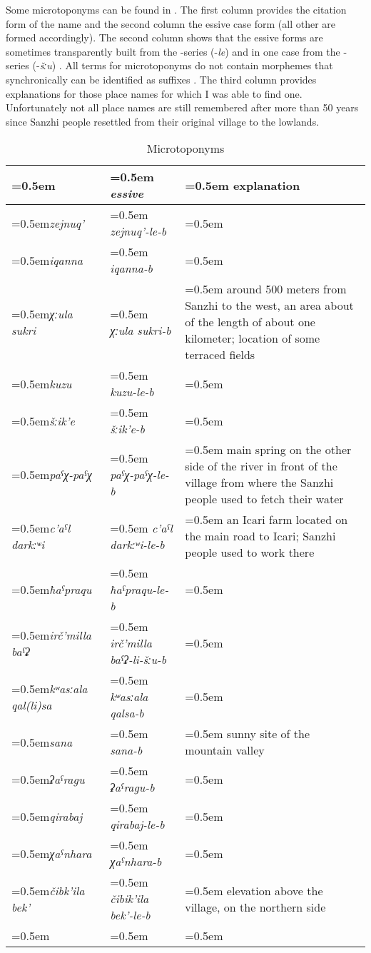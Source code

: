 Some microtoponyms can be found in . The first column provides the citation form of the name and the second column the essive case form (all other  are formed accordingly). The second column shows that the essive forms are sometimes transparently built from the -series (-\textit{le}) and in one case from the -series (-\textit{šːu}) . All terms for microtoponyms do not contain morphemes that synchronically can be identified as  suffixes . The third column provides explanations for those place names for which I was able to find one. Unfortunately not all place names are still remembered after more than 50 years since Sanzhi people resettled from their original village to the lowlands. 
%
\begin{table}
	\caption{Microtoponyms}
	\label{tab:Microtoponyms}
	\small
	\begin{tabularx}{0.98\textwidth}[]{%
		>{\raggedright\arraybackslash\hangindent=0.5em\itshape}p{60pt}
		>{\raggedright\arraybackslash\hangindent=0.5em\itshape}p{85pt}
		>{\raggedright\arraybackslash\hangindent=0.5em}X}
		
		\lsptoprule
		\upshape \isit{microtoponym}	&	\upshape essive 	&	explanation\\
		\midrule
		zejnuq' 		&	zejnuq'-le-b 		&	\\
		iqanna		&	iqanna-b		&	\\
		χːula sukri		&	χːula sukri-b		&	around 500 meters from Sanzhi to the west, an area about of the length of about one kilometer; location of some terraced fields\\
		kuzu			&	kuzu-le-b		&	\\
		šːik'e			&	šːik'e-b		&	\\
		paˁχ-paˁχ		&	paˁχ-paˁχ-le-b 	&	main spring on the other side of the river in front of the village from where the Sanzhi people used to fetch their water\\ 
		c'aˁl darkːʷi 		&	c'aˁl darkːʷi-le-b	&	an Icari farm located on the main road to Icari; Sanzhi people used to work there\\
		ħaˁpraqu 		&	ħaˁpraqu-le-b	&	\\
		irč'milla baˁʡ		&	irč'milla baˁʡ-li-šːu-b	&	\\
		kʷasːala qal(li)sa	&	kʷasːala qalsa-b 	&	\\
		sana			&	sana-b		&	sunny site of the mountain valley\\
		ʡaˁragu 		&	ʡaˁragu-b		&	\\
		qirabaj		&	qirabaj-le-b		&	\\
		χaˁnhara 		&	χaˁnhara-b		&	\\
		čibk'ila bek'		&	čibik'ila bek'-le-b	&	elevation above the village, on the northern side\\
		\lspbottomrule
	\end{tabularx}
\end{table}

